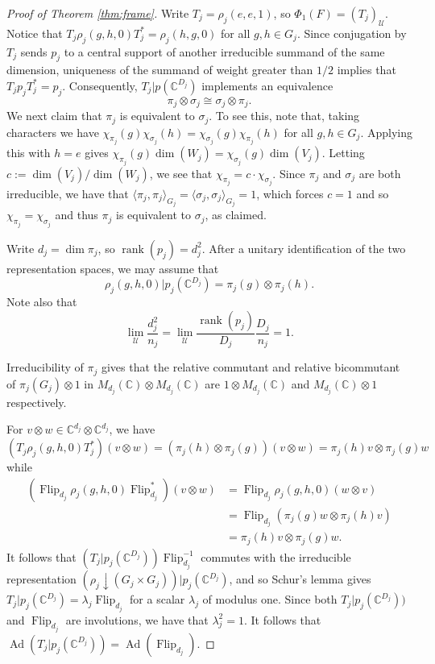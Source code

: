 \documentclass[12pt]{amsart}
\numberwithin{equation}{section}
\theoremstyle{definition}
\newcommand{\C}{\mathbb{C}}
\def\bb{\mathbb}
\def\cal{\mathcal}
\newcommand\cU{{\cal U}}
\begin{document}
\begin{proof}[Proof of Theorem \ref{thm:frame}]
Write $T_j=\rho_j(e,e,1)$, so $\Phi_1(F)=(T_j)_\cU$.  Notice that $T_j\rho_j(g,h,0)T_j^*=\rho_j(h,g,0)$ for all $g,h\in G_j$.  Since conjugation by $T_j$ sends $p_j$ to a central support of another irreducible
summand of the same dimension, uniqueness of the summand of
weight greater than $1/2$ implies that $T_jp_jT_j^*=p_j$.
Consequently, $T_j|p(\bb C^{D_j})$ implements an equivalence
\[
 \pi_j\otimes\sigma_j\cong\sigma_j\otimes\pi_j.
\]
We next claim that $\pi_j$ is equivalent to $\sigma_j$.  To see this, note that, taking characters we have $\chi_{\pi_j}(g)\chi_{\sigma_j}(h)=\chi_{\sigma_j}(g)\chi_{\pi_j}(h)$ for all $g,h\in G_j$.  Applying this with $h=e$ gives $\chi_{\pi_j}(g)\dim(W_j)=\chi_{\sigma_j}(g)\dim (V_j)$.  Letting $c:=\dim(V_j)/\dim(W_j)$, we see that $\chi_{\pi_j}=c\cdot \chi_{\sigma_j}$.  Since $\pi_j$ and $\sigma_j$ are both irreducible, we have that $\langle \pi_j,\pi_j\rangle_{G_j}=\langle \sigma_j,\sigma_j\rangle_{G_j}=1$, which forces $c=1$ and so $\chi_{\pi_j}=\chi_{\sigma_j}$ and thus $\pi_j$ is equivalent to $\sigma_j$, as claimed.  

Write $d_j=\dim\pi_j$, so $\operatorname{rank}(p_j)=d_j^2$.
After a unitary identification of the two representation spaces,
we may assume that
\[
 \rho_j(g,h,0)|{p_j(\bb C^{D_j})}=\pi_j(g)\otimes\pi_j(h).
\]
Note also that
\[
 \lim_\cU\frac{d_j^2}{n_j}
 =\lim_\cU\frac{\operatorname{rank}(p_j)}{D_j}
       \frac{D_j}{n_j}=1.
\]

Irreducibility of $\pi_j$ gives that the relative commutant and relative bicommutant of $\pi_j(G_j)\otimes 1$ in $M_{d_j}(\C)\otimes M_{d_j}(\C)$ are $1\otimes M_{d_j}(\C)$ and $M_{d_j}(\C)\otimes1$
respectively.

For $v\otimes w\in \bb C^{d_j}\otimes \bb C^{d_j}$, we have
$$(T_j\rho_j(g,h,0)T_j^*)(v\otimes w)=(\pi_j(h)\otimes \pi_j(g))(v\otimes w)=\pi_j(h)v\otimes \pi_j(g)w$$ while
\begin{align*}
 (\operatorname{Flip}_{d_j}\rho_j(g,h,0)\operatorname{Flip}_{d_j}^*)(v\otimes w)&=\operatorname{Flip}_{d_j}\rho_j(g,h,0)(w\otimes v)   \\
 &=\operatorname{Flip}_{d_j}(\pi_j(g)w\otimes \pi_j(h)v)\\
 &=\pi_j(h)v\otimes \pi_j(g)w.
\end{align*}
It follows that $(T_j|p_j(\bb C^{D_j}))\operatorname{Flip}_{d_j}^{-1}$ commutes with
the irreducible representation $(\rho_j\downarrow (G_j\times G_j))|p_j(\bb C^{D_j})$, and so Schur's lemma gives
$T_j|{p_j(\bb C^{D_j})}=\lambda_j\operatorname{Flip}_{d_j}$ for a scalar $\lambda_j$ of modulus one.
Since both $T_j|p_j(\bb C^{D_j}))$ and $\operatorname{Flip}_{d_j}$ are involutions, we have that $\lambda_j^2=1$.  It follows that $\operatorname{Ad}(T_j|p_j(\bb C^{D_j}))=\operatorname{Ad}(\operatorname{Flip}_{d_j})$.


\end{proof}
\end{document}
